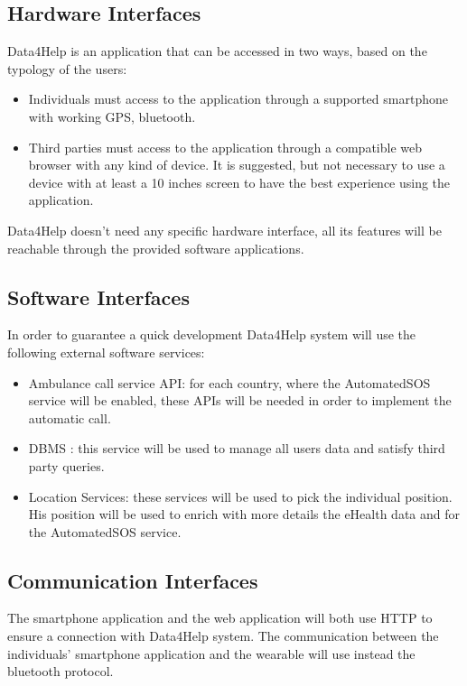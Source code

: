 \subsection{Hardware Interfaces}
Data4Help is an application that can be accessed in two ways, based on the typology of the users:
\begin{itemize}
\item Individuals must access to the application through a supported smartphone with working GPS, bluetooth.
\item Third parties must access to the application through a compatible web browser with any kind of device. It is suggested, but not necessary to use a device with at least a 10 inches screen to have the best experience using the application.
\end{itemize}
Data4Help doesn't need any specific hardware interface, all its features will be reachable through the provided software applications.








\subsection{Software Interfaces}
In order to guarantee a quick development Data4Help system will use the following external software services:
\begin{itemize}
\item Ambulance call service API: for each country, where the AutomatedSOS service will be enabled, these APIs will be needed in order to implement the automatic call.
\item DBMS : this service will be used to manage all users data and satisfy third party queries.
\item Location Services: these services will be used to pick the individual position. His position will be used to enrich with more details the eHealth data and for the AutomatedSOS service.
\end{itemize}

\subsection{Communication Interfaces}
The smartphone application and the web application will both use HTTP to ensure a connection with Data4Help system.
The communication between the individuals' smartphone application and the wearable will use instead the bluetooth protocol.

